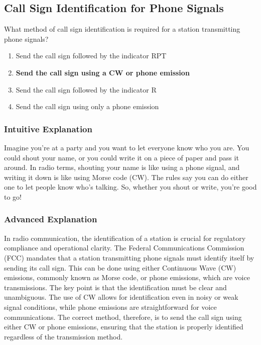 \subsection{Call Sign Identification for Phone Signals}
\label{T1F05}

\begin{tcolorbox}[colback=gray!10!white,colframe=black!75!black,title=T1F05]
What method of call sign identification is required for a station transmitting phone signals?
\begin{enumerate}[label=\Alph*)]
    \item Send the call sign followed by the indicator RPT
    \item \textbf{Send the call sign using a CW or phone emission}
    \item Send the call sign followed by the indicator R
    \item Send the call sign using only a phone emission
\end{enumerate}
\end{tcolorbox}

\subsubsection{Intuitive Explanation}
Imagine you're at a party and you want to let everyone know who you are. You could shout your name, or you could write it on a piece of paper and pass it around. In radio terms, shouting your name is like using a phone signal, and writing it down is like using Morse code (CW). The rules say you can do either one to let people know who's talking. So, whether you shout or write, you're good to go!

\subsubsection{Advanced Explanation}
In radio communication, the identification of a station is crucial for regulatory compliance and operational clarity. The Federal Communications Commission (FCC) mandates that a station transmitting phone signals must identify itself by sending its call sign. This can be done using either Continuous Wave (CW) emissions, commonly known as Morse code, or phone emissions, which are voice transmissions. The key point is that the identification must be clear and unambiguous. The use of CW allows for identification even in noisy or weak signal conditions, while phone emissions are straightforward for voice communications. The correct method, therefore, is to send the call sign using either CW or phone emissions, ensuring that the station is properly identified regardless of the transmission method.

